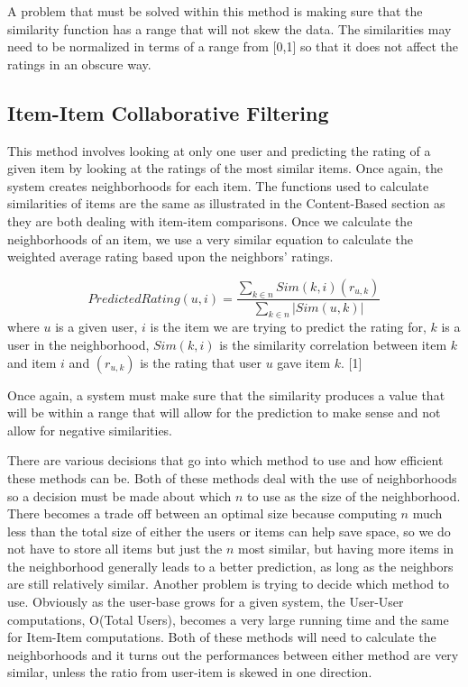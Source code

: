 \documentclass[11pt,reqno]{amsart}
\theoremstyle{definition}
\numberwithin{equation}{subsection}
\begin{document}
A problem that must be solved within this method is making sure that the similarity function has a range that will not skew the data. The similarities may need to be normalized in terms of a range from [0,1] so that it does not affect the ratings in an obscure way. 

\subsection{Item-Item Collaborative Filtering}

This method involves looking at only one user and predicting the rating of a given item by looking at the ratings of the most similar items. Once again, the system creates neighborhoods for each item. The functions used to calculate similarities of items are the same as illustrated in the Content-Based section as they are both dealing with item-item comparisons. Once we calculate the neighborhoods of an item, we use a very similar equation to calculate the weighted average rating based upon the neighbors' ratings.

\[
	PredictedRating(u,i) = \frac{\sum_{k \in n} Sim(k,i)(r_{u,k})}{\sum_{k \in n} |Sim(u,k)|}
\]
where $u$ is a given user, $i$ is the item we are trying to predict the rating for, $k$ is a user in the neighborhood, $Sim(k,i)$ is the similarity correlation between item $k$ and item $i$ and $(r_{u,k})$ is the rating that user $u$ gave item $k$. [1]

Once again, a system must make sure that the similarity produces a value that will be within a range that will allow for the prediction to make sense and not allow for negative similarities. 


	There are various decisions that go into which method to use and how efficient these methods can be. Both of these methods deal with the use of neighborhoods so a decision must be made about which $n$ to use as the size of the neighborhood. There becomes a trade off between an optimal size because computing $n$ much less than the total size of either the users or items can help save space, so we do not have to store all items but just the $n$ most similar, but having more items in the neighborhood generally leads to a better prediction, as long as the neighbors are still relatively similar. Another problem is trying to decide which method to use. Obviously as the user-base grows for a given system, the User-User computations, O(Total Users), becomes a very large running time and the same for Item-Item computations. Both of these methods will need to calculate the neighborhoods and it turns out the performances between either method are very similar, unless the ratio from user-item is skewed in one direction. 
\newline
\end{document}
